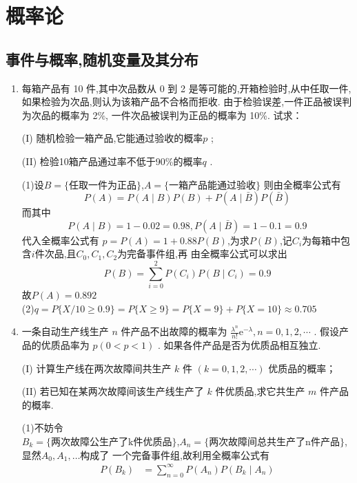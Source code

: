 \documentclass[12pt, a4paper, oneside, UTF8]{ctexbook}
\begin{document}
\else
\fi
\chapter{概率论}

\section{事件与概率,随机变量及其分布}
\begin{enumerate}
    \item 每箱产品有 10 件,其中次品数从 0 到 2 是等可能的,开箱检验时,从中任取一件,
    如果检验为次品,则认为该箱产品不合格而拒收. 由于检验误差,一件正品被误判为次品的概率为 2\%,
    一件次品被误判为正品的概率为 10\%. 试求：
        \item[(I)]随机检验一箱产品,它能通过验收的概率$p$ ;
        \item[(II)]检验10箱产品通过率不低于90\%的概率$q$ .
    \begin{solution}
        (1)设$B=\{\text{任取一件为正品}\}$,$A=\{\text{一箱产品能通过验收}\}$
        则由全概率公式有$$P(A)=P(A\mid B)P(B)+P(A\mid\bar{B})P(\bar{B})$$
        而其中$$P(A\mid B)= 1 - 0.02 = 0.98,P(A\mid\bar{B})=1-0.1=0.9$$代入全概率公式有
        $p=P(A)=1+0.88P(B)$,为求$P(B)$,记$C_i$为每箱中包含$i$件次品,且$C_0,C_1,C_2$为完备事件组,再
        由全概率公式可以求出$$P(B)=\sum_{i=0}^{2}P(C_i)P(B\mid C_i)=0.9$$故$P(A)=0.892$ \\
        (2)$q=P\{X/10\geq 0.9\}=P\{X\geq 9\}=P\{X=9\}+P\{X=10\}\approx 0.705$
    \end{solution}
    \item 一条自动生产线生产 $n$ 件产品不出故障的概率为 
    $\frac{{\lambda }^{n}}{n!}{\mathrm{e}}^{-\lambda },n = 0,1,2,\cdots$ . 
    假设产品的优质品率为 $p\left( {0 < p < 1}\right)$ . 如果各件产品是否为优质品相互独立.
        \item[(I)]计算生产线在两次故障间共生产 $k$ 件 $\left( {k = 0,1,2,\cdots }\right)$ 优质品的概率；
        \item[(II)]若已知在某两次故障间该生产线生产了 $k$ 件优质品,求它共生产 $m$ 件产品的概率.
    \begin{solution}
        (1)不妨令\\
        $B_k=\{\text{两次故障公生产了k件优质品}\}$,$A_n=\{\text{两次故障间总共生产了n件产品}\}$,显然$A_0,A_1,\ldots$构成了
        一个完备事件组,故利用全概率公式有
        \begin{align*}
        P(B_k) &=\sum_{n=0}^{\infty}P(A_n)P(B_k\mid A_n) \\

\end{align*}
\end{solution}
\end{enumerate}
\end{document}
